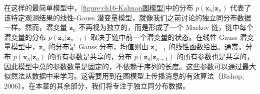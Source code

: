 \documentclass[../../main.tex]{subfiles}
\begin{document}
在这样的最简单模型中，\cref{figure:ch16-Kalman图模型}中的分布 $p(\bm{x}_n|\bm{z}_n)$ 代表了该特定观测结果的线性-Gauss 潜变量模型，就像我们之前讨论的独立同分布数据一样。然而，潜变量 $\bm{z}_n$ 不再视为独立的，而是形成了一个 Markov 链，链中每个潜变量的分布 $p(\bm{z}_n|\bm{z}_{n-1})$ 取决于链中前一个潜变量的状态。在线性-Gauss 潜变量模型中，$\bm{z}_n$ 的分布是 Gauss 分布，均值则由 $\bm{z}_{n-1}$ 的线性函数给出。通常，分布 $p(\bm{x}_n|\bm{z}_n)$ 的所有参数是共享的，分布 $p(\bm{z}_n|\bm{z}_{n-1})$ 的所有参数也是共享的，因此模型中总的参数数量是固定的，不依赖于序列的长度。这些参数可以通过最大似然法从数据中来学习。这需要用到在图模型上传播消息的有效算法（Bishop, 2006）。在本章的其余部分，我们将专注于独立同分布数据。
\end{document}

